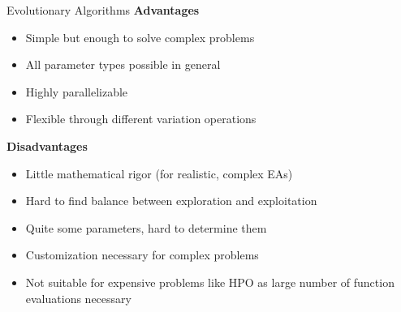 \documentclass[11pt,compress,t,notes=noshow, xcolor=table]{beamer}
\begin{document}
\begin{vbframe}{Evolutionary Algorithms}
\textbf{Advantages}
\begin{itemize}
    \item Simple but enough to solve complex problems %
    \item All parameter types possible in general
    \item Highly parallelizable
    \item Flexible through different variation operations
\end{itemize}

\medskip

\textbf{Disadvantages}
\begin{itemize}
    \item Little mathematical rigor (for realistic, complex EAs)
    \item Hard to find balance between exploration and exploitation
    \item Quite some parameters, hard to determine them
    \item Customization necessary for complex problems
    \item Not suitable for expensive problems like HPO as large number of function evaluations necessary
\end{itemize}
\end{vbframe}






\end{document}
